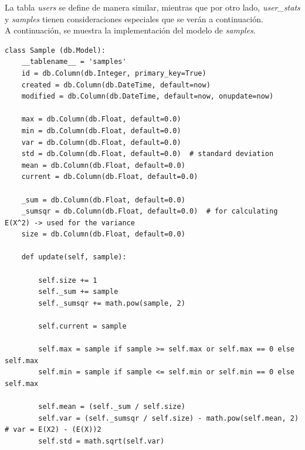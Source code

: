 \documentclass[11pt,letterpaper]{article}
\begin{document}
La tabla \emph{users} se define de manera similar, mientras que por otro lado, \emph{user\_stats} y \emph{samples} tienen consideraciones especiales que se verán a continuación.\\

A continuación, se muestra la implementación del modelo de \emph{samples}.

\begin{lstlisting}[title=Modelo de la tabla \emph{samples}]
class Sample (db.Model):
    __tablename__ = 'samples'
    id = db.Column(db.Integer, primary_key=True)
    created = db.Column(db.DateTime, default=now)
    modified = db.Column(db.DateTime, default=now, onupdate=now)

    max = db.Column(db.Float, default=0.0)
    min = db.Column(db.Float, default=0.0)
    var = db.Column(db.Float, default=0.0)
    std = db.Column(db.Float, default=0.0)  # standard deviation
    mean = db.Column(db.Float, default=0.0)
    current = db.Column(db.Float, default=0.0)

    _sum = db.Column(db.Float, default=0.0)
    _sumsqr = db.Column(db.Float, default=0.0)  # for calculating E(X^2) -> used for the variance
    size = db.Column(db.Float, default=0.0)

    def update(self, sample):

        self.size += 1
        self._sum += sample
        self._sumsqr += math.pow(sample, 2)

        self.current = sample

        self.max = sample if sample >= self.max or self.max == 0 else self.max
        self.min = sample if sample <= self.min or self.min == 0 else self.max

        self.mean = (self._sum / self.size)
        self.var = (self._sumsqr / self.size) - math.pow(self.mean, 2)  # var = E(X2) - (E(X))2
        self.std = math.sqrt(self.var)
\end{lstlisting}
\end{document}
